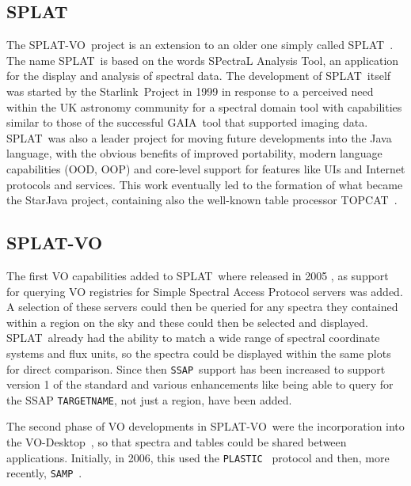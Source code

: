 \documentclass[final,authoryear,5p,times,twocolumn]{elsarticle}
\newcommand{\ssap}{\texttt{SSAP}}
\newcommand{\plastic}{\texttt{PLASTIC}}
\newcommand{\samp}{\texttt{SAMP}}
\newcommand{\splat}{\textsf{\small SPLAT}}
\newcommand{\splatvo}{{\textsf{\small{SPLAT-VO}}}}
\newcommand{\topcat}{\textsf{\small TOPCAT}}
\newcommand{\gaia}{\textsf{\small GAIA}}
\newcommand{\Starlink}{\textsf{\small Starlink}}
\newcommand{\vodesktop}{\textsf{\small VO-Desktop}}
\newcommand{\ascl}[1]{\href{http://www.ascl.net/#1}{ascl:#1}}
\begin{document}
\subsection{SPLAT}
%
The \splatvo\ project is an extension to an older one simply called
\splat\ \citep[][\ascl{1402.007}]{2002ASPC..281..513B}.  The name \splat\
is based on the words SPectraL Analysis Tool, an application for the
display and analysis of spectral data. The development of \splat\ itself
was started by the \Starlink\ Project \citep{1982QJRAS..23..485D} in
1999 in response to a perceived need within the UK astronomy community
for a spectral domain tool with capabilities similar to those of the
successful \gaia\ tool \citep[][\ascl{1403.024}]{2000ASPC..216..615D}
that supported imaging data. \splat\ was also a leader project for
moving future developments into the Java language, with the obvious
benefits of improved portability, modern language capabilities (OOD,
OOP) and core-level support for features like UIs and Internet
protocols and services. This work eventually led to the formation of
what became the StarJava project, containing also the well-known table processor \topcat\ \citep[][\ascl{1101.010}]{2005ASPC..347...29T}.

\subsection{SPLAT-VO}
%
The first VO capabilities added to \splat\ where released in 2005
\citep{2005ASPC..347...22D}, as support for querying VO registries for Simple
Spectral Access Protocol servers was added. A selection of these servers could
then be queried for any spectra they contained within a region on the sky and
these could then be selected and displayed. \splat\ already had the ability to
match a wide range of spectral coordinate systems and flux units, so the
spectra could be displayed within the same plots for direct comparison. Since
then \ssap\ support has been increased to support version 1 of the standard and
various enhancements like being able to query for the SSAP
\texttt{TARGETNAME}, not just a region, have been added.

The second phase of VO developments in \splatvo\ were the incorporation into
the \vodesktop\ \citep{2008ASPC..394..251W}, so that spectra and tables could
be shared between applications.  Initially, in 2006, this used the \plastic\
\citep{2007ASPC..376..511T} protocol and then, more recently, \samp\
\citep{2012ASPC..461..279T}.
\end{document}
